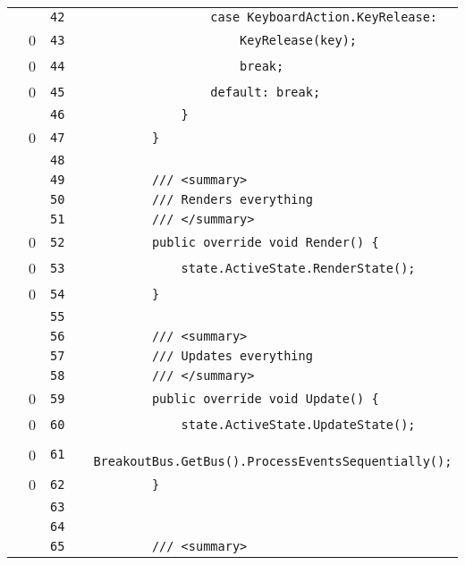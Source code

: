 \documentclass[a4paper,landscape,10pt]{article}
\begin{document}
\begin{longtable}[l]{lrrll}
\cellcolor{gray} &  & \verb~42~ & & \verb~                case KeyboardAction.KeyRelease:~\\
\cellcolor{red} & 0 & \verb~43~ & & \verb~                    KeyRelease(key);~\\
\cellcolor{red} & 0 & \verb~44~ & & \verb~                    break;~\\
\cellcolor{red} & 0 & \verb~45~ & & \verb~                default: break;~\\
\cellcolor{gray} &  & \verb~46~ & & \verb~            }~\\
\cellcolor{red} & 0 & \verb~47~ & & \verb~        }~\\
\cellcolor{gray} &  & \verb~48~ & & \verb~~\\
\cellcolor{gray} &  & \verb~49~ & & \verb~        /// <summary>~\\
\cellcolor{gray} &  & \verb~50~ & & \verb~        /// Renders everything~\\
\cellcolor{gray} &  & \verb~51~ & & \verb~        /// </summary>~\\
\cellcolor{red} & 0 & \verb~52~ & & \verb~        public override void Render() {~\\
\cellcolor{red} & 0 & \verb~53~ & & \verb~            state.ActiveState.RenderState();~\\
\cellcolor{red} & 0 & \verb~54~ & & \verb~        }~\\
\cellcolor{gray} &  & \verb~55~ & & \verb~~\\
\cellcolor{gray} &  & \verb~56~ & & \verb~        /// <summary>~\\
\cellcolor{gray} &  & \verb~57~ & & \verb~        /// Updates everything~\\
\cellcolor{gray} &  & \verb~58~ & & \verb~        /// </summary>~\\
\cellcolor{red} & 0 & \verb~59~ & & \verb~        public override void Update() {~\\
\cellcolor{red} & 0 & \verb~60~ & & \verb~            state.ActiveState.UpdateState();~\\
\cellcolor{red} & 0 & \verb~61~ & & \verb~            BreakoutBus.GetBus().ProcessEventsSequentially();~\\
\cellcolor{red} & 0 & \verb~62~ & & \verb~        }~\\
\cellcolor{gray} &  & \verb~63~ & & \verb~~\\
\cellcolor{gray} &  & \verb~64~ & & \verb~~\\
\cellcolor{gray} &  & \verb~65~ & & \verb~        /// <summary>~\\

\end{longtable}
\end{document}
